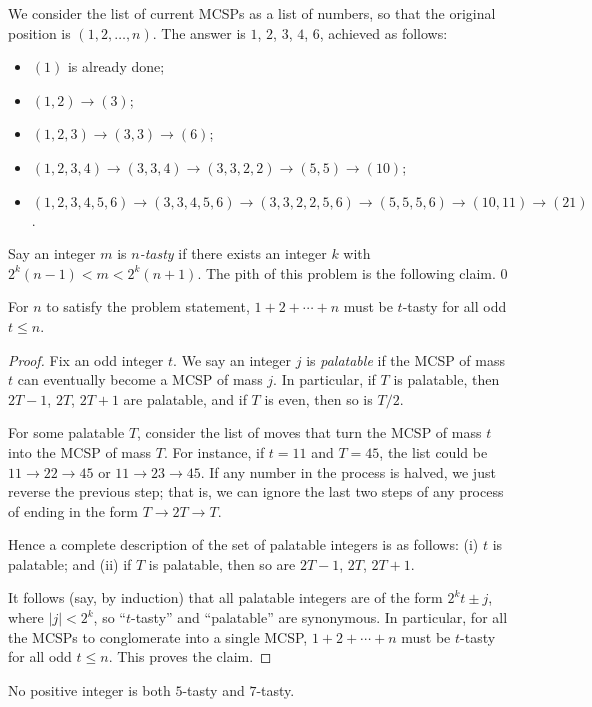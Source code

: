 We consider the list of current MCSPs as a list of numbers, so that the original position is $(1,2,\ldots,n)$. The answer is $1$, $2$, $3$, $4$, $6$, achieved as follows:
\begin{itemize}[itemsep=0em]
    \item $(1)$ is already done;
    \item $(1,2)\to(3)$;
    \item $(1,2,3)\to(3,3)\to(6)$;
    \item $(1,2,3,4)\to(3,3,4)\to(3,3,2,2)\to(5,5)\to(10)$;
    \item $(1,2,3,4,5,6)\to(3,3,4,5,6)\to(3,3,2,2,5,6)\to(5,5,5,6)\to(10,11)\to(21)$.
\end{itemize}
Say an integer $m$ is \emph{$n$-tasty} if there exists an integer $k$ with $2^k(n-1)<m<2^k(n+1)$. The pith of this problem is the following claim.
\setcounter{iclaim}0
\begin{iclaim}
    For $n$ to satisfy the problem statement, $1+2+\cdots+n$ must be $t$-tasty for all odd $t\le n$.
\end{iclaim}
\begin{proof}
    Fix an odd integer $t$. We say an integer $j$ is \emph{palatable} if the MCSP of mass $t$ can eventually become a MCSP of mass $j$. In particular, if $T$ is palatable, then $2T-1$, $2T$, $2T+1$ are palatable, and if $T$ is even, then so is $T/2$.

    For some palatable $T$, consider the list of moves that turn the MCSP of mass $t$ into the MCSP of mass $T$. For instance, if $t=11$ and $T=45$, the list could be $11\to22\to45$ or $11\to23\to45$. If any number in the process is halved, we just reverse the previous step; that is, we can ignore the last two steps of any process of ending in the form $T\to2T\to T$.

    Hence a complete description of the set of palatable integers is as follows: (i) $t$ is palatable; and (ii) if $T$ is palatable, then so are $2T-1$, $2T$, $2T+1$.

    It follows (say, by induction) that all palatable integers are of the form $2^kt\pm j$, where $|j|<2^k$, so ``$t$-tasty'' and ``palatable'' are synonymous. In particular, for all the MCSPs to conglomerate into a single MCSP, $1+2+\cdots+n$ must be $t$-tasty for all odd $t\le n$. This proves the claim.
\end{proof}
\begin{iclaim}
    No positive integer is both $5$-tasty and $7$-tasty.
\end{iclaim}
